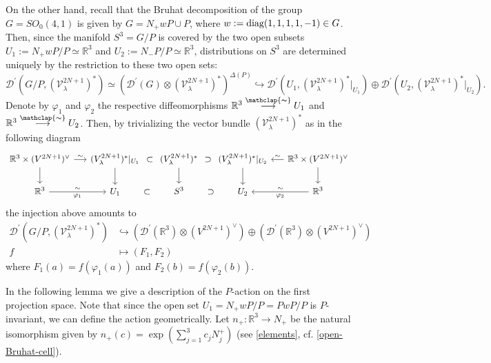 \documentclass[12pt, pdflatex, a4paper]{article}
\theoremstyle{plain}
\theoremstyle{definition}
\def\diag{\text{\normalfont{diag}}}
\def\Dist{\mathcal{D}^\prime}
\def\R{{\mathbb R}}
\def\V{\mathcal{V}}
\newcommand\arrowsimeq{\stackrel{\mathclap{\thicksim}}{\longrightarrow}}
\begin{document}
On the other hand, recall that the Bruhat decomposition of the group $G = SO_0(4,1)$ is given by $G = N_+wP \cup P$, where $w := \diag(1, 1, 1, 1, -1) \in G$. Then, since the manifold $S^3 = G/P$ is covered by the two open subsets $U_1 := N_+wP/P \simeq \R^3$ and $U_2 := N_-P/P \simeq \R^3$, distributions on $S^3$ are determined uniquely by the restriction to these two open sets:
\begin{equation*}
\Dist(G/P, (\V_\lambda^{2N+1})^*)\simeq (\Dist(G)\otimes (\V_\lambda^{2N+1})^*)^{\Delta(P)} \hookrightarrow \Dist(U_1, (\V_\lambda^{2N+1})^*\rvert_{U_1}) \oplus \Dist(U_2, (\V_\lambda^{2N+1})^*\rvert_{U_2}).
\end{equation*}
Denote by $\varphi_1$ and $\varphi_2$ the respective diffeomorphisms $\R^3 \arrowsimeq U_1$ and $\R^3 \arrowsimeq U_2$. Then, by trivializing the vector bundle $(\V_\lambda^{2N+1})^*$ as in the following diagram 
\begin{equation*}
\begin{tikzcd}[column sep = 0.5cm]
\R^3 \times (V^{2N+1})^\vee \arrow[r,"\sim"] \arrow[d] & (V_\lambda^{2N+1})^*\rvert_{U_1} \arrow[r, phantom, "\subset"] \arrow[d] & (V_\lambda^{2N+1})^* \arrow[r, phantom, "\supset"] \arrow[d] & (V_\lambda^{2N+1})^*\rvert_{U_2} \arrow[d] & \R^3 \times (V^{2N+1})^\vee \arrow[l,"\sim"'] \arrow[d]\\
\R^3 \arrow[r, "\sim", "\varphi_1"'] & U_1 \arrow[r, phantom, "\subset"] & S^3  \arrow[r, phantom, "\supset"] & U_2 & \R^3 \arrow[l, "\sim"', "\varphi_2"]
\end{tikzcd}
\end{equation*}
the injection above amounts to
\begin{equation}\label{distribution-injection}
\begin{aligned}
\Dist(G/P, (\V_\lambda^{2N+1})^*) &\hookrightarrow \left(\Dist(\R^3) \otimes (V^{2N+1})^\vee\right) \oplus \left(\Dist(\R^3) \otimes (V^{2N+1})^\vee\right)\\
f &\mapsto (F_1, F_2)
\end{aligned}
\end{equation}
where $F_1(a) = f(\varphi_1(a))$ and $F_2(b) = f(\varphi_2(b))$.

In the following lemma we give a description of the $P$-action on the first projection space. Note that since the open set $U_1 = N_+wP/P = PwP/P$ is $P$-invariant, we can define the action geometrically. Let $n_+: \R^3 \rightarrow N_+$ be the natural isomorphism given by $n_+(c) = \exp(\sum_{j=1}^3 c_jN_j^+)$ (see \eqref{elements}, cf. \eqref{open-Bruhat-cell}).
\end{document}
